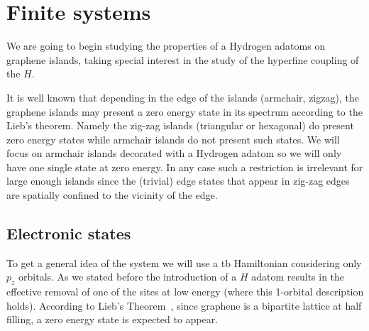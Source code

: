 \section{Finite systems}
We are going to begin studying the properties of a Hydrogen adatoms on graphene islands, taking special interest in the study of the hyperfine coupling of the $H$.

It is well known that depending in the edge of the islands (armchair, zigzag), the graphene islands may present a zero energy state in its spectrum according to the Lieb's theorem. Namely the zig-zag islands (triangular or hexagonal) do present zero energy states while armchair islands do not present such states.
We will focus on armchair islands decorated with a Hydrogen adatom so we will only have one single state at zero energy. In any case such a restriction is irrelevant for large enough islands since the (trivial) edge states that appear in zig-zag edges are spatially confined to the vicinity of the edge.


\subsection{Electronic states}
To get a general idea of the system we will use a \ac{tb} Hamiltonian considering only $p_z$ orbitals. As we stated before the introduction of a $H$ adatom results in the effective removal of one of the sites at low energy (where this 1-orbital description holds). According to Lieb's Theorem~\cite{Lieb1989}, since graphene is a bipartite lattice at half filling, a zero energy state is expected to appear.


